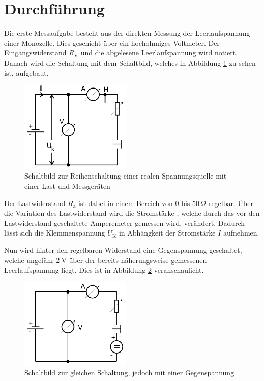 \section{Durchführung}
\label{sec:Durchführung}

Die erste Messaufgabe besteht aus der direkten Messung der Leerlaufspannung einer
Monozelle. Dies geschieht über ein hochohmiges Voltmeter. Der Eingangswiderstand
$R_\text{V}$ und die abgelesene Leerlaufspannung wird notiert.
Danach wird die Schaltung mit dem Schaltbild, welches in Abbildung \ref{fig:schaltbild1}
zu sehen ist, aufgebaut.

\begin{figure}
  \centering
  \includegraphics[width=150pt]{data/schaltbild1.png}
  \caption{Schaltbild zur Reihenschaltung einer realen Spannungsquelle mit einer Last und Messgeräten \cite{Versuchsanleitung}}
  \label{fig:schaltbild1}
\end{figure}

Der Lastwiderstand $R_\text{a}$ ist dabei in einem Bereich von $0$ bis
$\SI{50}{\ohm}$ regelbar. Über die Variation des Lastwiderstand wird die Stromstärke
, welche durch das vor den Lastwiderstand geschaltete Amperemeter gemessen wird,
verändert. Dadurch lässt sich die Klemmenspannung $U_\text{K}$ in Abhängkeit der
Stromstärke $I$ aufnehmen.

Nun wird hinter den regelbaren Widerstand eine Gegenspannung geschaltet, welche
ungefähr $\SI{2}{\volt}$ über der bereits näherungsweise gemessenen Leerlaufspannung
liegt. Dies ist in Abbildung \ref{fig:schaltbild2} veranschaulicht.

\begin{figure}
  \centering
  \includegraphics[width=150pt]{data/schaltbild2.png}
  \caption{Schaltbild zur gleichen Schaltung, jedoch mit einer Gegenspannung \cite{Versuchsanleitung}}
  \label{fig:schaltbild2}
\end{figure}

